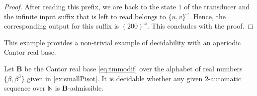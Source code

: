 \documentclass[12pt,reqno]{amsart}
\newcommand{\B}{{\mathbf{B}}}
\begin{document}
\begin{proof}
After reading this prefix, we are back to the state $1$ of the transducer and the infinite input suffix that is left to read belongs to $\{u,v\}^\omega$. Hence, the corresponding output for this suffix is $(200)^\omega$. This concludes with the proof.
\end{proof}

This example provides a non-trivial example of decidability with an aperiodic Cantor real base. 

\begin{proposition}
Let $\B$ be the Cantor real base \eqref{eq:tmmodif} over the alphabet of real numbers $\{\beta,\beta^3\}$ given in \cref{ex:smallPisot}.  
It is decidable whether any given $2$-automatic sequence over $\mathbb{N}$ is $\B$-admissible.
\end{proposition}
\end{document}
